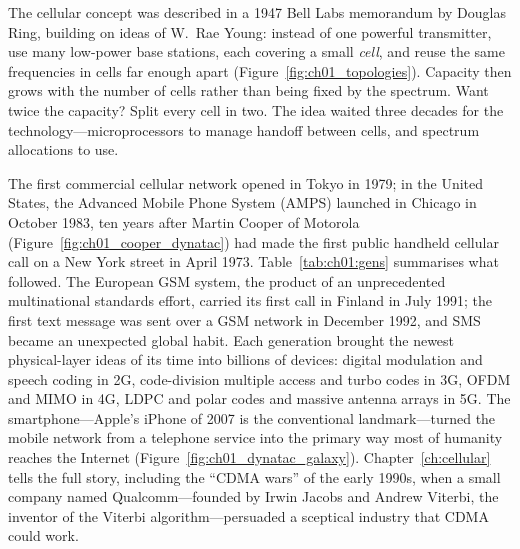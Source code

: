 The cellular concept was described in a 1947 Bell Labs memorandum by Douglas Ring, building on ideas
of W.~Rae Young: instead of one powerful transmitter, use many low-power base stations, each covering
a small \emph{cell}, and reuse the same frequencies in cells far enough apart
(Figure~\ref{fig:ch01_topologies}). Capacity then grows with the number of cells rather than being
fixed by the spectrum. Want twice the capacity? Split every cell in two. The idea waited three decades
for the technology---microprocessors to manage handoff between cells, and spectrum allocations to use.

The first commercial cellular network opened in Tokyo in 1979; in the United States, the Advanced
Mobile Phone System (AMPS) launched in Chicago in October 1983, ten years after Martin Cooper of
Motorola (Figure~\ref{fig:ch01_cooper_dynatac}) had made the first public handheld cellular call on a
New York street in April 1973. Table~\ref{tab:ch01:gens} summarises what followed. The European GSM
system, the product of an unprecedented multinational standards effort, carried its first call in
Finland in July 1991; the first text message was sent over a GSM network in December 1992, and SMS
became an unexpected global habit. Each generation brought the newest physical-layer ideas of its time
into billions of devices: digital modulation and speech coding in 2G, code-division multiple access and
turbo codes in 3G, OFDM and MIMO in 4G, LDPC and polar codes and massive antenna arrays in 5G. The
smartphone---Apple's iPhone of 2007 is the conventional landmark---turned the mobile network from a
telephone service into the primary way most of humanity reaches the Internet
(Figure~\ref{fig:ch01_dynatac_galaxy}). Chapter~\ref{ch:cellular} tells the full story, including the
``CDMA wars'' of the early 1990s, when a small company named Qualcomm---founded by Irwin Jacobs and
Andrew Viterbi, the inventor of the Viterbi algorithm---persuaded a sceptical industry that CDMA could
work.


